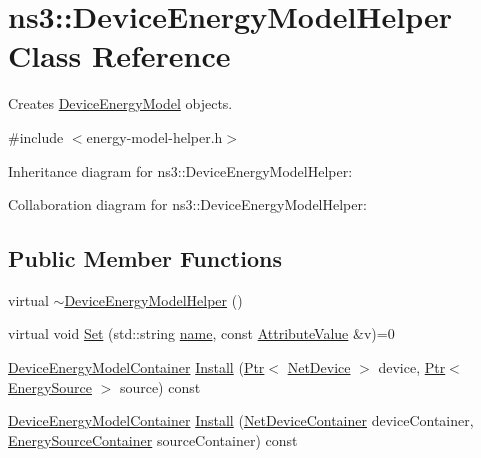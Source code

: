 \hypertarget{classns3_1_1DeviceEnergyModelHelper}{}\section{ns3\+:\+:Device\+Energy\+Model\+Helper Class Reference}
\label{classns3_1_1DeviceEnergyModelHelper}


Creates \hyperlink{classns3_1_1DeviceEnergyModel}{Device\+Energy\+Model} objects.  




{\ttfamily \#include $<$energy-\/model-\/helper.\+h$>$}



Inheritance diagram for ns3\+:\+:Device\+Energy\+Model\+Helper\+:


Collaboration diagram for ns3\+:\+:Device\+Energy\+Model\+Helper\+:
\subsection*{Public Member Functions}
\begin{DoxyCompactItemize}
\item 
virtual \hyperlink{classns3_1_1DeviceEnergyModelHelper_aa89774fb648081c7c2afb565ed2ae648}{$\sim$\+Device\+Energy\+Model\+Helper} ()
\item 
virtual void \hyperlink{classns3_1_1DeviceEnergyModelHelper_ae46cb6c0e4460e35578448f30cf48542}{Set} (std\+::string \hyperlink{generate__test__data__lte__spectrum__model_8m_ab74e6bf80237ddc4109968cedc58c151}{name}, const \hyperlink{classns3_1_1AttributeValue}{Attribute\+Value} \&v)=0
\item 
\hyperlink{classns3_1_1DeviceEnergyModelContainer}{Device\+Energy\+Model\+Container} \hyperlink{classns3_1_1DeviceEnergyModelHelper_a085a4854e96ff8f314a9ebec93e6c4eb}{Install} (\hyperlink{classns3_1_1Ptr}{Ptr}$<$ \hyperlink{classns3_1_1NetDevice}{Net\+Device} $>$ device, \hyperlink{classns3_1_1Ptr}{Ptr}$<$ \hyperlink{classns3_1_1EnergySource}{Energy\+Source} $>$ source) const 
\item 
\hyperlink{classns3_1_1DeviceEnergyModelContainer}{Device\+Energy\+Model\+Container} \hyperlink{classns3_1_1DeviceEnergyModelHelper_a11fe4216c2fdf2442cf2109b9e5eee21}{Install} (\hyperlink{classns3_1_1NetDeviceContainer}{Net\+Device\+Container} device\+Container, \hyperlink{classns3_1_1EnergySourceContainer}{Energy\+Source\+Container} source\+Container) const 
\end{DoxyCompactItemize}
